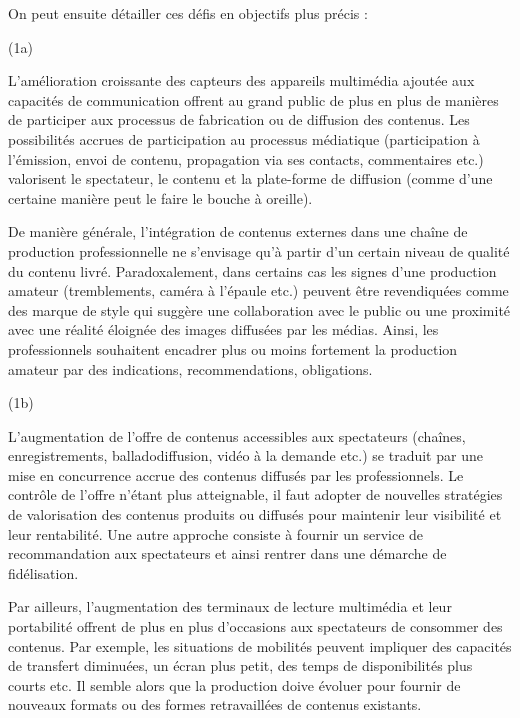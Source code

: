 On peut ensuite détailler ces défis en objectifs plus précis :
\begin{liste}
	\item[(1a)] 

	L'amélioration croissante des capteurs des appareils multimédia ajoutée aux capacités de communication offrent au grand public de plus en plus de manières de participer aux processus de fabrication ou de diffusion des contenus.
	Les possibilités accrues de participation au processus médiatique (participation à l'émission, envoi de contenu, propagation via ses contacts, commentaires etc.) valorisent le spectateur, le contenu et la plate-forme de diffusion (comme d'une certaine manière peut le faire le bouche à oreille).

	De manière générale, l'intégration de contenus externes dans une chaîne de production professionnelle ne s'envisage  qu'à partir d'un certain niveau de qualité du contenu livré.  
	Paradoxalement, dans certains cas les signes d'une production amateur (tremblements, caméra à l'épaule etc.) peuvent être revendiquées comme des marque de style qui suggère une collaboration avec le public ou une proximité avec une réalité éloignée des images diffusées par les médias.
	Ainsi, les professionnels souhaitent encadrer plus ou moins fortement la production amateur par des indications, recommendations, obligations.\\


	\item[(1b)] 

	L'augmentation de l'offre de contenus accessibles aux spectateurs (chaînes, enregistrements, balladodiffusion, vidéo à la demande etc.) se traduit par une mise en concurrence accrue des contenus diffusés par les professionnels.
	Le contrôle de l'offre n'étant plus atteignable, il faut adopter de nouvelles stratégies de valorisation des contenus produits ou diffusés pour maintenir leur visibilité et leur rentabilité. 
	Une autre approche consiste à fournir un service de recommandation aux spectateurs et ainsi rentrer dans une démarche de fidélisation. 

	Par ailleurs, l'augmentation des terminaux de lecture multimédia et leur portabilité offrent de plus en plus d'occasions aux spectateurs de consommer des contenus. 
	Par exemple, les situations de mobilités peuvent impliquer des capacités de transfert diminuées, un écran plus petit, des temps de disponibilités plus courts etc.
	Il semble alors que la production doive évoluer pour fournir de nouveaux formats ou des formes retravaillées de contenus existants.


\end{liste}
